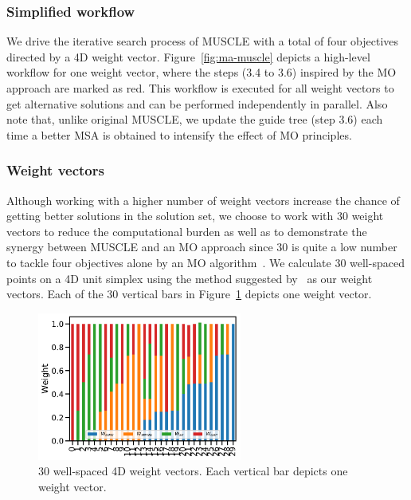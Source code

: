 \subsubsection{Simplified workflow}
We drive the iterative search process of MUSCLE with a total of four objectives directed by a 4D weight vector. Figure~\ref{fig:ma-muscle} depicts a high-level workflow for one weight vector, where the steps (3.4 to 3.6) inspired by the MO approach are marked as red. This workflow is executed for all weight vectors to get alternative solutions and can be performed independently in parallel. %
Also note that, unlike original MUSCLE, we update the guide tree (step 3.6) each time a better MSA is obtained to intensify the effect of MO principles.

\subsubsection{Weight vectors}
Although working with a higher number of weight vectors increase the chance of getting better solutions in the solution set, we choose to work with 30 weight vectors to reduce the computational burden as well as to demonstrate the synergy between MUSCLE and an MO approach since 30 is quite a low number to tackle four objectives alone by an MO algorithm~\cite{deb2014evolutionary}. We calculate 30 well-spaced points on a 4D unit simplex using the method suggested by~\cite{ref_dirs_energy} as our weight vectors. Each of the 30 vertical bars in Figure~\ref{fig:30-weights} depicts one weight vector. %


\begin{figure}[!htbp]%
	\centering
	\includegraphics[width=0.6\textwidth]{Figure/30-4D-weight}
	\caption{30 well-spaced 4D weight vectors. Each vertical bar depicts one weight vector.}
	\label{fig:30-weights}
\end{figure}

